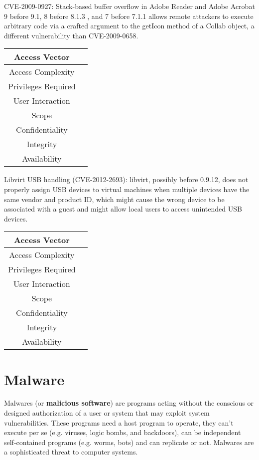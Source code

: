 \documentclass[a4paper, 10pt, titlepage]{article}
\begin{document}
CVE-2009-0927: Stack-based buffer overflow in Adobe Reader and Adobe Acrobat 9 before 9.1, 8 before 8.1.3 , and 7 before 7.1.1 allows remote attackers to execute arbitrary code via a crafted argument to the getIcon method of a Collab object, a different vulnerability than CVE-2009-0658.
\begin{small}
	\begin{center}
		\begin{tabular}{|c|c|}\hline
			Access Vector & \\\hline
			Access Complexity & \\\hline
			Privileges Required & \\\hline
			User Interaction & \\\hline
			Scope & \\\hline
			Confidentiality & \\\hline
			Integrity & \\\hline
			Availability & \\ \hline
		\end{tabular}
	\end{center}
\end{small}
Libvirt USB handling (CVE-2012-2693): libvirt, possibly before 0.9.12, does not properly assign USB devices to virtual machines when multiple devices have the same vendor and product ID, which might cause the wrong device to be associated with a guest and might allow local users to access unintended USB devices.
\begin{small}
	\begin{center}
		\begin{tabular}{|c|c|}\hline
			Access Vector & \\\hline
			Access Complexity & \\\hline
			Privileges Required & \\\hline
			User Interaction & \\\hline
			Scope & \\\hline
			Confidentiality & \\\hline
			Integrity & \\\hline
			Availability & \\ \hline
		\end{tabular}
	\end{center}
\end{small}

\newpage
\section{Malware}
Malwares (or \textbf{malicious software}) are programs acting without the conscious or designed authorization of a user or system that may exploit system vulnerabilities. These programs need a host program to operate, they can't execute per se (e.g. viruses, logic bombs, and backdoors), can be independent self-contained programs (e.g. worms, bots) and can replicate or not. Malwares are a sophisticated threat to computer systems.
\end{document}
